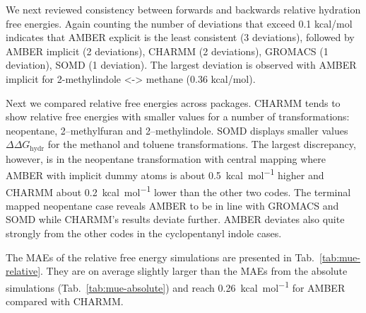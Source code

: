 \documentclass[journal=jctcce,manuscript=article]{achemso}
\begin{document}
We next reviewed consistency between forwards and backwards relative hydration free energies. Again counting the number of deviations that exceed 0.1 kcal/mol indicates that AMBER explicit is the least consistent (3 deviations), followed by AMBER implicit (2 deviations), CHARMM (2 deviations), GROMACS (1 deviation), SOMD (1 deviation). The largest deviation is observed with AMBER implicit for 2-methylindole <-> methane (0.36 kcal/mol).

Next we compared relative free energies across packages.
CHARMM tends to show relative free energies with smaller values for a number of transformations:  neopentane, 2--methylfuran and 2--methylindole. SOMD displays smaller values $\Delta\Delta G_{\mathrm{hydr}}$ for the methanol and toluene transformations.  The largest discrepancy, however, is in the neopentane transformation with central mapping where AMBER with implicit dummy atoms is about \SI{0.5}{kcal.mol^{-1}} higher and CHARMM about \SI{0.2}{kcal.mol^{-1}} lower than the other two codes.  The
terminal mapped neopentane case reveals AMBER to be in line with GROMACS and SOMD while CHARMM's results deviate further.  AMBER deviates also quite strongly from the other codes in the cyclopentanyl indole cases.

The MAEs of the relative free energy simulations are presented in
Tab.~\ref{tab:mue-relative}.  They are on average slightly larger than the MAEs from the absolute simulations (Tab.~\ref{tab:mue-absolute}) and reach \SI{0.26}{kcal.mol^{-1}} for AMBER compared with CHARMM.

\begin{table}[]
 \begin{minipage}{\linewidth}
   \caption{MAE (in \si{kcal.mol^{-1}}) comparing relative free energies from
     relative simulations between SOMD, GROMACS, AMBER and
     CHARMM.}\label{tab:mue-relative}
 \end{minipage}
\end{table}
\end{document}
